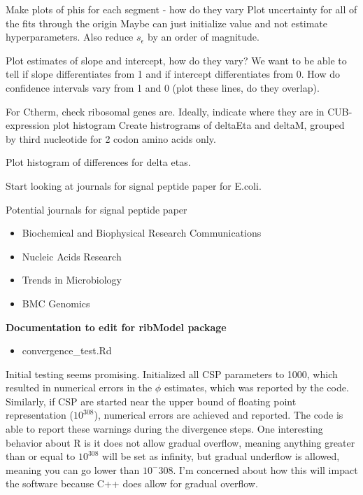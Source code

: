 \documentclass[11pt]{labbook}
\begin{document}
Make plots of phis for each segment - how do they vary
Plot uncertainty for all of the fits through the origin
Maybe can just initialize value and not estimate hyperparameters. Also reduce $s_\epsilon$ by an order of magnitude. 

Plot estimates of slope and intercept, how do they vary? We want to be able to tell if slope differentiates from 1 and if intercept differentiates from 0. How do confidence intervals vary from 1 and 0 (plot these lines, do they overlap). 

For Ctherm, check ribosomal genes are. Ideally, indicate where they are in CUB-expression plot histogram
Create histrograms of deltaEta and deltaM, grouped by third nucleotide for 2 codon amino acids only.  

Plot histogram of differences for delta etas. 

Start looking at journals for signal peptide paper for E.coli.  

Potential journals for signal peptide paper
\begin{itemize}
	\item Biochemical and Biophysical Research Communications
	\item Nucleic Acids Research
	\item Trends in Microbiology
	\item BMC Genomics
\end{itemize}


\textbf{Documentation to edit for ribModel package}
\begin{itemize}
	\item convergence\_test.Rd
\end{itemize}







Initial testing seems promising. Initialized all CSP parameters to 1000, which resulted in numerical errors in the $\phi$ estimates, which was reported by the code. Similarly, if CSP are started near the upper bound of floating point representation ($10^308$), numerical errors are achieved and reported. The code is able to report these warnings during the divergence steps. One interesting behavior about R is it does not allow gradual overflow, meaning anything greater than or equal to $10^308$ will be set as infinity, but gradual underflow is allowed, meaning you can go lower than $10^-308$. I'm concerned about how this will impact the software because C++ does allow for gradual overflow. 
\end{document}
